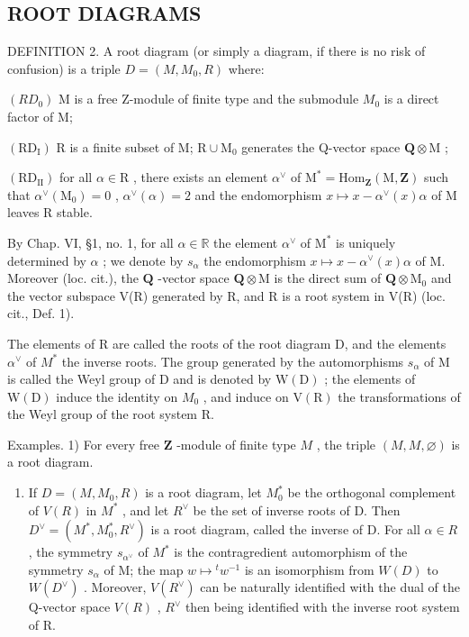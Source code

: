 \subsection{ROOT DIAGRAMS}

DEFINITION 2. A root diagram (or simply a diagram, if there is no risk of confusion) is a triple \(D = (M, M_{0}, R)\) where:

\((RD_{0})\) M is a free Z-module of finite type and the submodule \(M_{0}\) is a direct factor of M;

\((\mathrm{RD}_{\mathrm{I}})\) R is a finite subset of M; \(\mathrm{R} \cup \mathrm{M}_0\) generates the Q-vector space \(\mathbf{Q} \otimes \mathrm{M}\) ;

\((\mathrm{RD}_{\mathrm{II}})\) for all \(\alpha \in \mathrm{R}\) , there exists an element \(\alpha^{\vee}\) of \(\mathrm{M}^{*} = \mathrm{Hom}_{\mathbf{Z}}(\mathrm{M}, \mathbf{Z})\) such that \(\alpha^{\vee}(\mathrm{M}_{0}) = 0\) , \(\alpha^{\vee}(\alpha) = 2\) and the endomorphism \(x \mapsto x - \alpha^{\vee}(x)\alpha\) of M leaves R stable.

By Chap. VI, §1, no. 1, for all \(\alpha \in \mathbb{R}\) the element \(\alpha^{\vee}\) of \(\mathrm{M}^*\) is uniquely determined by \(\alpha\) ; we denote by \(s_{\alpha}\) the endomorphism \(x \mapsto x - \alpha^{\vee}(x)\alpha\) of M. Moreover (loc. cit.), the \(\mathbf{Q}\) -vector space \(\mathbf{Q} \otimes \mathrm{M}\) is the direct sum of \(\mathbf{Q} \otimes \mathrm{M}_0\) and the vector subspace V(R) generated by R, and R is a root system in V(R) (loc. cit., Def. 1).

The elements of R are called the roots of the root diagram D, and the elements \(\alpha^{\vee}\) of \(M^{*}\) the inverse roots. The group generated by the automorphisms \(s_{\alpha}\) of M is called the Weyl group of D and is denoted by \(\mathrm{W(D)}\) ; the elements of \(\mathrm{W(D)}\) induce the identity on \(M_{0}\) , and induce on \(\mathrm{V(R)}\) the transformations of the Weyl group of the root system R.

Examples. 1) For every free \(\mathbf{Z}\) -module of finite type \(M\) , the triple \((M, M, \varnothing)\) is a root diagram.

\begin{enumerate}
\def\labelenumi{\arabic{enumi})}
\setcounter{enumi}{1}
\tightlist
\item
  If \(D = (M, M_{0}, R)\) is a root diagram, let \(M_{0}^{*}\) be the orthogonal complement of \(V(R)\) in \(M^{*}\) , and let \(R^{\vee}\) be the set of inverse roots of D. Then \(D^{\vee} = (M^{*}, M_{0}^{*}, R^{\vee})\) is a root diagram, called the inverse of D. For all \(\alpha \in R\) , the symmetry \(s_{\alpha^{\vee}}\) of \(M^{*}\) is the contragredient automorphism of the symmetry \(s_{\alpha}\) of M; the map \(w \mapsto {}^{t} w^{-1}\) is an isomorphism from \(W(D)\) to \(W(D^{\vee})\) . Moreover, \(V(R^{\vee})\) can be naturally identified with the dual of the Q-vector space \(V(R)\) , \(R^{\vee}\) then being identified with the inverse root system of R.
\end{enumerate}


